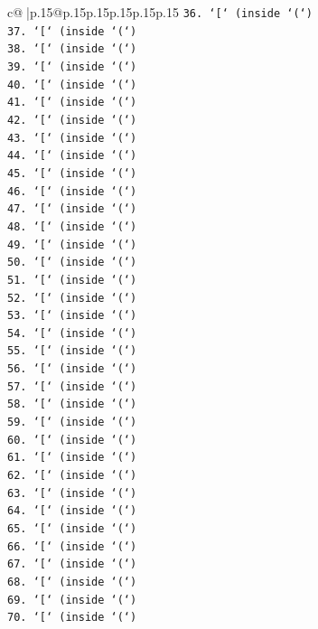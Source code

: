\documentclass{article}
\begin{document}
{\begin{supertabular}{c@{$\;$}|p{.15\linewidth}@{}p{.15\linewidth}p{.15\linewidth}p{.15\linewidth}p{.15\linewidth}p{.15\linewidth}}
{{{\texttt{36. `{[}` (inside `(`)} \\
\texttt{37. `{[}` (inside `(`)} \\
\texttt{38. `{[}` (inside `(`)} \\
\texttt{39. `{[}` (inside `(`)} \\
\texttt{40. `{[}` (inside `(`)} \\
\texttt{41. `{[}` (inside `(`)} \\
\texttt{42. `{[}` (inside `(`)} \\
\texttt{43. `{[}` (inside `(`)} \\
\texttt{44. `{[}` (inside `(`)} \\
\texttt{45. `{[}` (inside `(`)} \\
\texttt{46. `{[}` (inside `(`)} \\
\texttt{47. `{[}` (inside `(`)} \\
\texttt{48. `{[}` (inside `(`)} \\
\texttt{49. `{[}` (inside `(`)} \\
\texttt{50. `{[}` (inside `(`)} \\
\texttt{51. `{[}` (inside `(`)} \\
\texttt{52. `{[}` (inside `(`)} \\
\texttt{53. `{[}` (inside `(`)} \\
\texttt{54. `{[}` (inside `(`)} \\
\texttt{55. `{[}` (inside `(`)} \\
\texttt{56. `{[}` (inside `(`)} \\
\texttt{57. `{[}` (inside `(`)} \\
\texttt{58. `{[}` (inside `(`)} \\
\texttt{59. `{[}` (inside `(`)} \\
\texttt{60. `{[}` (inside `(`)} \\
\texttt{61. `{[}` (inside `(`)} \\
\texttt{62. `{[}` (inside `(`)} \\
\texttt{63. `{[}` (inside `(`)} \\
\texttt{64. `{[}` (inside `(`)} \\
\texttt{65. `{[}` (inside `(`)} \\
\texttt{66. `{[}` (inside `(`)} \\
\texttt{67. `{[}` (inside `(`)} \\
\texttt{68. `{[}` (inside `(`)} \\
\texttt{69. `{[}` (inside `(`)} \\
\texttt{70. `{[}` (inside `(`)} \\
}}}
\end{supertabular}}
\end{document}
